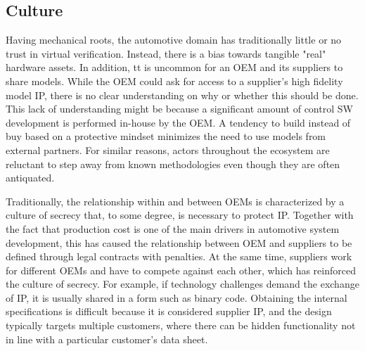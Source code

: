 \subsection{Culture}
Having mechanical roots, the automotive domain has traditionally little or no trust in virtual verification. Instead, there is a bias towards tangible "real" hardware assets.
In addition, tt is uncommon for an OEM and its suppliers to share models.
While the OEM could ask for access to a supplier’s high fidelity model IP, there is no clear understanding on why or whether this should be done.
This lack of understanding might be because a significant amount of control SW development is performed in-house by the OEM.
A tendency to build instead of buy based on a protective mindset minimizes the need to use models from external partners. For similar reasons, actors throughout the ecosystem are reluctant to step away from known methodologies even though they are often antiquated.

Traditionally, the relationship within and between OEMs is characterized by a culture of secrecy that, to some degree, is necessary to protect IP. Together with the fact that production cost is one of the main drivers in automotive system development, this has caused the relationship between OEM and suppliers to be defined through legal contracts with penalties. At the same time, suppliers work for different OEMs and have to compete against each other, which has reinforced the culture of secrecy.
For example, if technology challenges demand the exchange of IP, it is usually shared in a form such as binary code.
Obtaining the internal specifications is difficult because it is considered supplier IP, and the design typically targets multiple customers, where there can be hidden functionality not in line with a particular customer’s data sheet.

